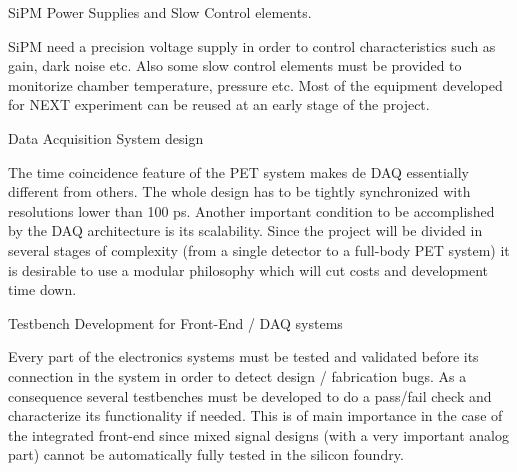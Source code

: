 SiPM Power Supplies and Slow Control elements.

SiPM need a precision voltage supply in order to control characteristics such as gain, dark noise etc. Also some slow control elements must be provided to monitorize chamber temperature, pressure etc. Most of the equipment developed for NEXT experiment can be reused at an early stage of the project.




Data Acquisition System design

The time coincidence feature of the PET system makes de DAQ essentially different from others. The whole design has to be tightly synchronized with resolutions lower than 100 ps. Another important condition to be accomplished by the DAQ architecture is its scalability. Since the project will be divided in several stages of complexity (from a single detector to a full-body PET system) it is desirable to use a modular philosophy which will cut costs and development time down.


Testbench Development for Front-End / DAQ systems

Every part of the electronics systems must be tested and validated before its connection in the system in order to detect design / fabrication bugs. As a consequence several testbenches must be developed to do a pass/fail check and characterize its functionality if needed. This is of main importance in the case of the integrated front-end since mixed signal designs (with a very important analog part) cannot be automatically fully tested in the silicon foundry.

